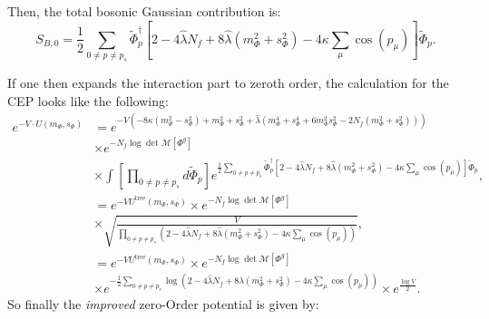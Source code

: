 Then, the total bosonic Gaussian contribution is:
\begin{equation}\label{eq:CEP_alternative_bosonic_Gaussian_contribution}
 S_{B,0} = \frac{1}{2}  \sum\limits_{0\neq p \neq p_s}  \tilde\Phi_p^{\dagger}  
              \left[ 2 - 4 \hat\lambda N_f + 8 \hat\lambda \left( m_{\Phi}^2 + s_{\Phi}^2  \right) - 4 \kappa \sum_{\mu} \cos(p_{\mu}) \right]  \tilde\Phi_p.
\end{equation}

If one then expands the interaction part to zeroth order, the calculation for the CEP looks like the following:
\begin{align}\label{eq:deriv_of_bosDet_step1}
 e^{-V\cdot U(m_{\Phi}, s_{\Phi})} &= 
           e^{-V\left(
             -8 \kappa \left( m_{\Phi}^2 - s_{\Phi}^2 \right)  +  m_{\Phi}^2 + s_{\Phi}^2 
             + \hat\lambda \left( m_{\Phi}^4 + s_{\Phi}^4 + 6 m_{\Phi}^2s_{\Phi}^2 - 2 N_f \left(m_{\Phi}^2 + s_{\Phi}^2\right) \right) \right)} 
             \nonumber \\
             &\times e^{-N_f \log \det \mathcal{M}[\Phi^g]} 
             \nonumber \\
             &\times \int \left[\prod\limits_{0 \neq p \neq p_s}  d \tilde \Phi_p \right] 
              e^{ \frac{1}{2}  \sum\limits_{0\neq p \neq p_s}  \tilde\Phi_p^{\dagger}  
              \left[ 2 - 4 \hat\lambda N_f + 8 \hat\lambda \left( m_{\Phi}^2 + s_{\Phi}^2  \right) - 4 \kappa \sum_{\mu} \cos(p_{\mu}) \right]  \tilde\Phi_p}, 
          \\ \label{eq:deriv_of_bosDet_step2}
          &= e^{-V U^{\text{tree}}(m_{\Phi}, s_{\Phi})} \times e^{-N_f \log \det \mathcal{M}[\Phi^g]} 
          \nonumber \\
          & \times \sqrt{\frac{V}{\prod\limits_{0 \neq p \neq p_s} 
             \left(  2 - 4 \hat\lambda N_f + 8 \hat\lambda \left( m_{\Phi}^2 + s_{\Phi}^2  \right) - 4 \kappa \sum_{\mu} \cos(p_{\mu}) \right) }} ,
             \\\label{eq:deriv_of_bosDet_step3}
          &=  e^{-V U^{\text{tree}}(m_{\Phi}, s_{\Phi})} \times e^{-N_f \log \det \mathcal{M}[\Phi^g]} 
            \nonumber \\
          & \times e^{-\frac{1}{2}\sum\limits_{0 \neq p \neq p_s} 
          \log\left( 2 - 4 \hat\lambda N_f + 8 \hat\lambda \left( m_{\Phi}^2 + s_{\Phi}^2  \right) - 4 \kappa \sum_{\mu} \cos(p_{\mu}) \right)}
            \times e^{\frac{\log V}{2}}.
\end{align}
So finally the \textit{improved} zero-Order potential is given by:
